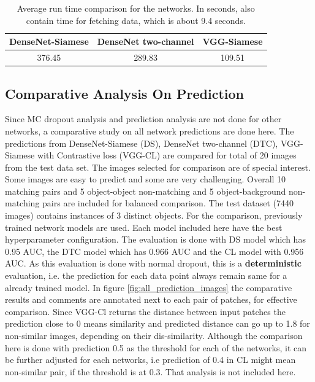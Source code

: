 \begin{table}[ht]
\centering
\caption{Average run time comparison for the networks. In seconds, also contain time for fetching data, which is about 9.4 seconds.}
\resizebox{0.7\textwidth}{!}
{\begin{tabular}{|c c c|} 
\rowcolor{lightgrey}
 \hline\hline
 DenseNet-Siamese &  DenseNet two-channel &  VGG-Siamese\\ [0.5ex]
 \hline
 376.45 & 289.83 & 109.51 \\
 \hline \hline
 \end{tabular}}
\label{table:run_time_compare}
\end{table}

\subsection{Comparative Analysis On Prediction}
Since MC dropout analysis and prediction analysis are not done for other networks, a comparative study on all network predictions are done here. The predictions from DenseNet-Siamese (DS), DenseNet two-channel (DTC), VGG-Siamese with Contrastive loss 
(VGG-CL) are compared for total of 20 images from the test data set. The images selected for comparison are of special interest. Some images are easy to predict and some are very challenging. 
Overall 10 matching pairs and 5 object-object non-matching and 5 object-background non-matching pairs are included for balanced comparison. 
The test dataset (7440 images) contains instances of 3 distinct objects. For the comparison, previously trained network models are used. Each model included here have the best hyperparameter configuration. The evaluation is done with 
DS model which has 0.95 AUC, the DTC model which has 0.966 AUC and the CL model with 0.956 AUC. As this evaluation is done with normal dropout, this is a \textbf{deterministic} evaluation, i.e. the prediction for each data point always 
remain same for a already trained model. In figure \ref{fig:all_prediction_images} the comparative results and comments are annotated next to each pair of patches, for effective comparison. Since VGG-Cl returns the distance between 
input patches the prediction close to 0 means similarity and predicted distance can go up to 1.8 for non-similar images, depending on their dis-similarity. Although the comparison here is done with prediction 0.5 as the threshold 
for each of the networks, it can be further adjusted for each networks, i.e prediction of 0.4 in CL might mean non-similar pair, if the threshold is at 0.3. That analysis is not included here.

